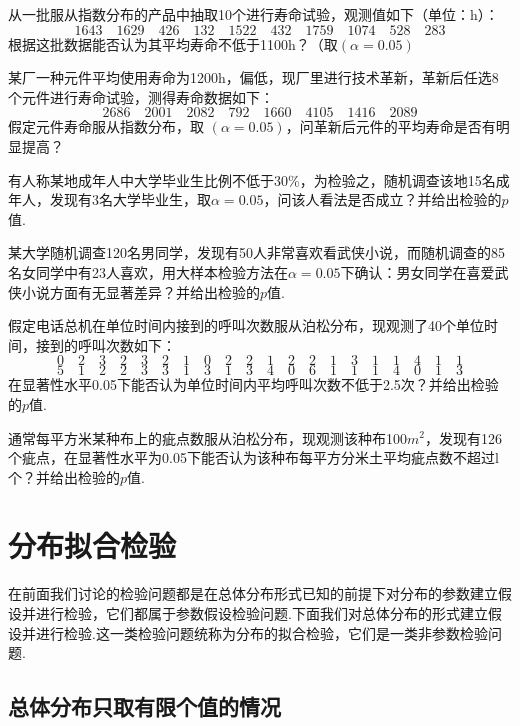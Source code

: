 \begin{xiti}
	\item 从一批服从指数分布的产品中抽取10个进行寿命试验，观测值如下（单位：h）：
	\[1643 \quad 1629 \quad 426 \quad 132 \quad 1522 \quad 432 \quad 1759 \quad 1074 \quad 528 \quad 283\]
	根据这批数据能否认为其平均寿命不低于1100h？（取$(\alpha=0.05)$
		
	\item 某厂一种元件平均使用寿命为1200h，偏低，现厂里进行技术革新，革新后任选8个元件进行寿命试验，测得寿命数据如下：
	\[2686 \quad 2001 \quad 2082 \quad 792 \quad 1660 \quad 4105 \quad 1416 \quad 2089\]
	假定元件寿命服从指数分布，取 $(\alpha=0.05)$，问革新后元件的平均寿命是否有明显提高？
	
	\item 有人称某地成年人中大学毕业生比例不低于30\%，为检验之，随机调查该地15名成年人，发现有3名大学毕业生，取$\alpha=0.05$，问该人看法是否成立？并给出检验的$p$值.
		
	\item 某大学随机调查120名男同学，发现有50人非常喜欢看武侠小说，而随机调查的85名女同学中有23人喜欢，用大样本检验方法在$\alpha=0.05$下确认：男女同学在喜爱武侠小说方面有无显著差异？并给出检验的$p$值.
	
			
	\item 假定电话总机在单位时间内接到的呼叫次数服从泊松分布，现观测了40个单位时间，接到的呼叫次数如下：
	\[0 \quad 2 \quad 3 \quad 2 \quad 3 \quad 2 \quad 1 \quad 0 \quad 2 \quad 2 \quad 1 \quad 2 \quad 2 \quad 1 \quad 3 \quad 1 \quad 1 \quad 4 \quad 1 \quad 1\]
	\[5 \quad 1 \quad 2 \quad 2 \quad 3 \quad 3 \quad 1 \quad 3 \quad 1 \quad 3 \quad 4 \quad 0 \quad 6 \quad 1 \quad 1 \quad 1 \quad 4 \quad 0 \quad 1 \quad 3\]
	在显著性水平0.05下能否认为单位时间内平均呼叫次数不低于2.5次？并给出检验的$p$值.
				
	\item 通常每平方米某种布上的疵点数服从泊松分布，现观测该种布100$m^{2}$，发现有126个疵点，在显著性水平为0.05下能否认为该种布每平方分米土平均疵点数不超过l个？并给出检验的$p$值.
\end{xiti}
\section{分布拟合检验}\label{sec:7.4}
在前面我们讨论的检验问题都是在总体分布形式已知的前提下对分布的参数建立假设并进行检验，它们都属于参数假设检验问题.下面我们对总体分布的形式建立假设并进行检验.这一类检验问题统称为分布的拟合检验，它们是一类非参数检验问题.

\subsection{总体分布只取有限个值的情况}\label{sec:7.3.1}

